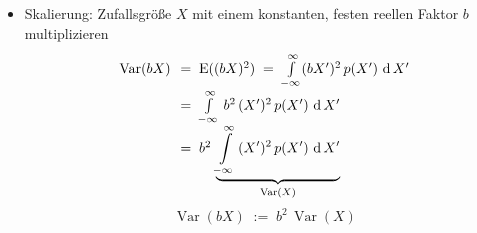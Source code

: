 \begin{itemize}
\item Skalierung:
Zufallsgröße $X$ mit einem konstanten, festen reellen Faktor $b$ multiplizieren
\begin{equation}
\arraycolsep=3.5pt\def\arraystretch{1.8}
\begin{array}{ll}
\operatorname {Var}(b X) & = \; \operatorname{E}((b X)^2) \; = \;
 \int\limits_{-\infty}^{\infty}
 (b X^\prime)^2 \, p(X^\prime) \, \operatorname{d} X^\prime\\
 & =\;  \int\limits_{-\infty}^{\infty} \, b^2 \,
 (X^\prime)^2 \, p(X^\prime) \, \operatorname{d} X^\prime\\
 & =\;  b^2 \, \underbrace{\int\limits_{-\infty}^{\infty} \,
 (X^\prime)^2 \, p(X^\prime) \, \operatorname{d} X^\prime}_{\operatorname {Var}(X)}
\end{array}
\end{equation}
\begin{equation}
\operatorname {Var}(b X) \; := \; b^2 \, \operatorname {Var}(X)
\end{equation}
\end{itemize}


